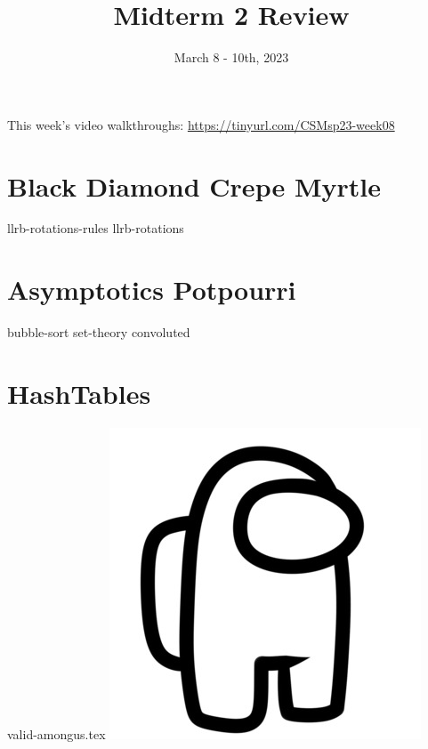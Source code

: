 \documentclass[11pt]{exam}
\title{Midterm 2 Review}
\date{March 8 - 10th, 2023}
\begin{document}
\maketitle
This week's video walkthroughs:
\href{https://tinyurl.com/CSMsp23-week08}{https://tinyurl.com/CSMsp23-week08}


\section{Black Diamond Crepe Myrtle}
\begin{questions}
{llrb-rotations-rules}
{llrb-rotations}
\end{questions}
\pagebreak


\section{Asymptotics Potpourri}
\begin{questions}
{bubble-sort}  
{set-theory} 
{convoluted}  
\end{questions}
\pagebreak




\section{HashTables}
\begin{questions}
{valid-amongus.tex}
\includegraphics[scale=.025]{images/sus.png}
\end{questions}
\pagebreak
\end{document}
